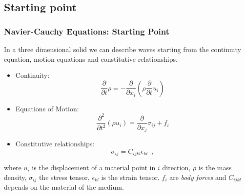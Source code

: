 \documentclass{beamer}
\begin{document}
\subsection{Starting point}
\begin{frame}\frametitle{Navier-Cauchy Equations: Starting Point}
In a three dimensional solid we can describe waves starting from the continuity equation, motion equations and constitutive relationships.
\begin{itemize}
\item Continuity:
\[\frac{\partial}{\partial t}\rho = - \frac{\partial}{\partial x_i}\left( \rho \frac{\partial}{\partial t} u_i\right)\]

\item Equations of Motion:
\[ \frac{\partial^2}{\partial t^2}(\rho u_i) = \frac{\partial}{\partial x_j} \sigma_{ij} + f_i \]

\item Constitutive relationships:
\[\sigma_{ij} = C_{ijkl} \epsilon_{kl}  \enspace ,\]

\end{itemize}
where $u_i$ is the displacement of a material point in $i$ direction, $\rho$ is the mass density, $\sigma_{ij}$ the stress tensor, $\epsilon_{kl}$ is the strain tensor, $f_i$ are \emph{body forces} and $C_{ijkl}$ depends on the material of the medium.
\end{frame}

\end{document}

